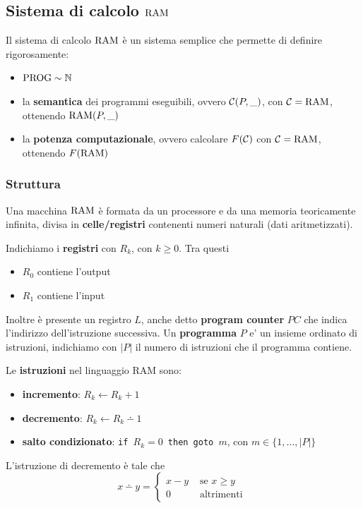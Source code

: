 \subsection{Sistema di calcolo $\text{RAM}$}
Il sistema di calcolo $\text{RAM}$ è un sistema semplice che permette di definire rigorosamente: 
\begin{itemize}
	\item $\text{PROG} \sim \mathbb{N}$
	\item la \textbf{semantica} dei programmi eseguibili, ovvero $\mathcal{C}(P,\_)$, con $\mathcal{C} = \text{RAM}$, ottenendo $\text{RAM} (P,\_)$
	\item la \textbf{potenza computazionale}, ovvero calcolare $F(\mathcal{C})$ con $\mathcal{C} = \text{RAM}$, ottenendo $F(\text{RAM})$
\end{itemize}

\subsubsection{Struttura}
Una macchina $\text{RAM}$ è formata da un processore e da una memoria teoricamente infinita, divisa in \textbf{celle/registri} contenenti numeri naturali (dati aritmetizzati).

Indichiamo i \textbf{registri} con $R_k$, con $k \geq 0$. Tra questi 
\begin{itemize}
	\item $R_0$ contiene l'output
	\item $R_1$ contiene l'input
\end{itemize}

Inoltre è presente un registro $L$, anche detto \textbf{program counter} $PC$ che indica l'indirizzo dell'istruzione successiva. Un \textbf{programma} $P$ e' un insieme ordinato di istruzioni, indichiamo con $|P|$ il numero di istruzioni che il programma contiene.

Le \textbf{istruzioni} nel linguaggio RAM sono: 
\begin{itemize}
	\item \textbf{incremento}: $R_k \leftarrow R_k + 1$
	\item \textbf{decremento}: $R_k \leftarrow R_k \dotminus 1$
	\item \textbf{salto condizionato}: \texttt{if $R_k = 0$ then goto $m$}, con $m \in \{1, \dots, |P|\}$
\end{itemize}
L'istruzione di decremento è tale che
$$ x \dotminus y = \begin{cases}
	x-y & \text{ se } x \geq y\\
	0 & \text{ altrimenti }
\end{cases}$$


